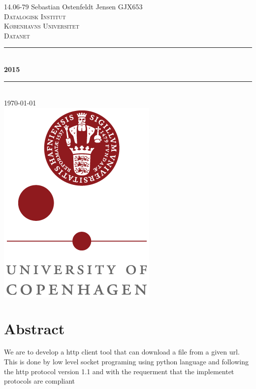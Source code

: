 \documentclass[a4paper,12pt,danish]{report}
\begin{document}
\begin{titlepage}

\newcommand{\HRule}{\rule{\linewidth}{0.4mm}}
\center
\small{14.06-79 Sebastian Ostenfeldt Jensen \textsc{GJX653}
} \\[2cm]

\textsc{\LARGE Datalogisk Institut}\\[0.5cm]
\textsc{\large Københavns Universitet}\\[1.5cm]
\textsc{\large Datanet}\\
\HRule \\[0.7cm]
{\huge \bfseries 2015}\\[0.4cm]
\HRule \\[1.5cm]
\textsc{\Large \textsc{\today}}\\[0.5cm]

\includegraphics[scale=0.5]{ku_logo.png}\\[1cm]

\end{titlepage}
\tableofcontents
\newpage
\renewcommand{\thesection}{\arabic{section}}
\renewcommand{\thempfootnote}{\arabic{mpfootnote}}
\renewcommand\thesubsection{}
\newcommand{\minus}[1]{{#1}^{-}}
\section{Abstract}
We are to develop a http client tool that can download a file from a given url.
This is done by low level socket programing using python language and following
the http protocol version 1.1 and with the requerment that the implementet protocols are compliant
\end{document}
